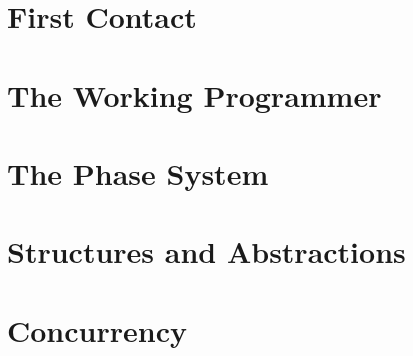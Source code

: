 



\frontmatter


\mainmatter

\part{First Contact}





\part{The Working Programmer}







\part{The Phase System}





\part{Structures and Abstractions}





\part{Concurrency}




